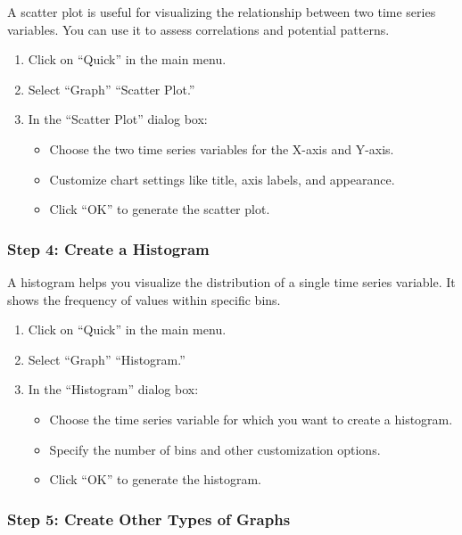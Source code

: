 \documentclass[
  letterpaper,
  DIV=11,
  numbers=noendperiod]{scrartcl}
\begin{document}
A scatter plot is useful for visualizing the relationship between two
time series variables. You can use it to assess correlations and
potential patterns.

\begin{enumerate}
\def\labelenumi{\arabic{enumi}.}
\item
  Click on ``Quick'' in the main menu.
\item
  Select ``Graph'' ``Scatter Plot.''
\item
  In the ``Scatter Plot'' dialog box:

  \begin{itemize}
  \item
    Choose the two time series variables for the X-axis and Y-axis.
  \item
    Customize chart settings like title, axis labels, and appearance.
  \item
    Click ``OK'' to generate the scatter plot.
  \end{itemize}
\end{enumerate}

\hypertarget{step-4-create-a-histogram}{%
\subsubsection{\texorpdfstring{\textbf{Step 4: Create a
Histogram}}{Step 4: Create a Histogram}}\label{step-4-create-a-histogram}}

A histogram helps you visualize the distribution of a single time series
variable. It shows the frequency of values within specific bins.

\begin{enumerate}
\def\labelenumi{\arabic{enumi}.}
\item
  Click on ``Quick'' in the main menu.
\item
  Select ``Graph'' ``Histogram.''
\item
  In the ``Histogram'' dialog box:

  \begin{itemize}
  \item
    Choose the time series variable for which you want to create a
    histogram.
  \item
    Specify the number of bins and other customization options.
  \item
    Click ``OK'' to generate the histogram.
  \end{itemize}
\end{enumerate}

\hypertarget{step-5-create-other-types-of-graphs}{%
\subsubsection{\texorpdfstring{\textbf{Step 5: Create Other Types of
Graphs}}{Step 5: Create Other Types of Graphs}}\label{step-5-create-other-types-of-graphs}}
\end{document}
